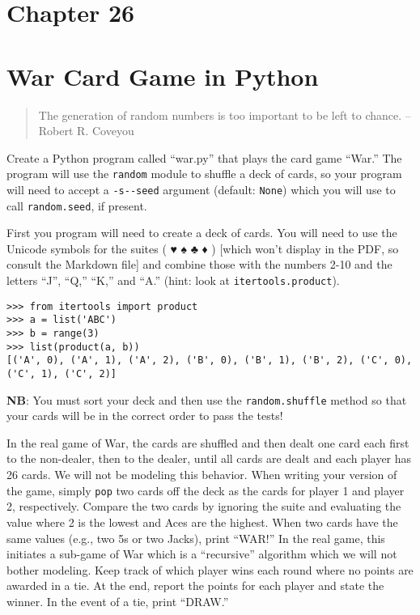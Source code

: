 \documentclass[]{article}
\begin{document}
\pagebreak

\hypertarget{chapter-26}{%
\section{Chapter 26}\label{chapter-26}}

\hypertarget{war-card-game-in-python}{%
\section{War Card Game in Python}\label{war-card-game-in-python}}

\begin{quote}
The generation of random numbers is too important to be left to chance.
-- Robert R. Coveyou
\end{quote}

Create a Python program called ``war.py'' that plays the card game
``War.'' The program will use the \texttt{random} module to shuffle a
deck of cards, so your program will need to accept a
\texttt{-s\textbar{}-\/-seed} argument (default: \texttt{None}) which
you will use to call \texttt{random.seed}, if present.

First you program will need to create a deck of cards. You will need to
use the Unicode symbols for the suites ( ♥ ♠ ♣ ♦ ) {[}which won't
display in the PDF, so consult the Markdown file{]} and combine those
with the numbers 2-10 and the letters ``J'', ``Q,'' ``K,'' and ``A.''
(hint: look at \texttt{itertools.product}).

\begin{verbatim}
>>> from itertools import product
>>> a = list('ABC')
>>> b = range(3)
>>> list(product(a, b))
[('A', 0), ('A', 1), ('A', 2), ('B', 0), ('B', 1), ('B', 2), ('C', 0), ('C', 1), ('C', 2)]
\end{verbatim}

\textbf{NB}: You must sort your deck and then use the
\texttt{random.shuffle} method so that your cards will be in the correct
order to pass the tests!

In the real game of War, the cards are shuffled and then dealt one card
each first to the non-dealer, then to the dealer, until all cards are
dealt and each player has 26 cards. We will not be modeling this
behavior. When writing your version of the game, simply \texttt{pop} two
cards off the deck as the cards for player 1 and player 2, respectively.
Compare the two cards by ignoring the suite and evaluating the value
where 2 is the lowest and Aces are the highest. When two cards have the
same values (e.g., two 5s or two Jacks), print ``WAR!'' In the real
game, this initiates a sub-game of War which is a ``recursive''
algorithm which we will not bother modeling. Keep track of which player
wins each round where no points are awarded in a tie. At the end, report
the points for each player and state the winner. In the event of a tie,
print ``DRAW.''
\end{document}
